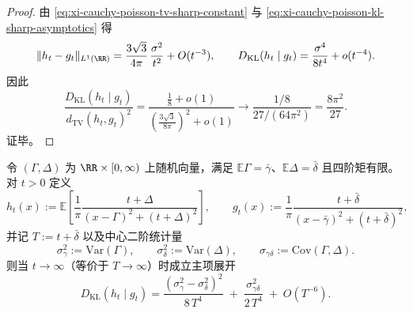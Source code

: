 \begin{proof}
由 \eqref{eq:xi-cauchy-poisson-tv-sharp-constant} 与 \eqref{eq:xi-cauchy-poisson-kl-sharp-asymptotics} 得
\[
\|h_t-g_t\|_{L^1(\RR)}
=\frac{3\sqrt3}{4\pi}\,\frac{\sigma^2}{t^2}+O(t^{-3}),
\qquad
D_{\mathrm{KL}}(h_t\mid g_t)=\frac{\sigma^4}{8t^4}+o(t^{-4}).
\]
因此
\[
\frac{D_{\mathrm{KL}}(h_t\mid g_t)}{d_{\mathrm{TV}}(h_t,g_t)^2}
=\frac{\frac{1}{8}+o(1)}{\left(\frac{3\sqrt3}{8\pi}\right)^2+o(1)}
\to \frac{1/8}{27/(64\pi^2)}=\frac{8\pi^2}{27}.
\]
证毕。
\end{proof}
\begin{theorem}[双通道粗粒化的正交主模态分解]\label{thm:xi-cauchy-poisson-two-channel-orthogonal-leading}
令 \((\Gamma,\Delta)\) 为 \(\RR\times[0,\infty)\) 上随机向量，满足
\(
\mathbb{E}\Gamma=\bar\gamma
\)、\(
\mathbb{E}\Delta=\bar\delta
\) 且四阶矩有限。
对 \(t>0\) 定义
\[
h_t(x):=\mathbb{E}\!\left[\frac{1}{\pi}\frac{t+\Delta}{(x-\Gamma)^2+(t+\Delta)^2}\right],
\qquad
g_t(x):=\frac{1}{\pi}\frac{t+\bar\delta}{(x-\bar\gamma)^2+(t+\bar\delta)^2},
\]
并记 \(T:=t+\bar\delta\) 以及中心二阶统计量
\[
\sigma_\gamma^2:=\mathrm{Var}(\Gamma),\qquad
\sigma_\delta^2:=\mathrm{Var}(\Delta),\qquad
\sigma_{\gamma\delta}:=\mathrm{Cov}(\Gamma,\Delta).
\]
则当 \(t\to\infty\)（等价于 \(T\to\infty\)）时成立主项展开
\begin{equation}\label{eq:xi-cauchy-poisson-two-channel-kl-leading}
\boxed{\;
D_{\mathrm{KL}}(h_t\mid g_t)
=\frac{(\sigma_\gamma^2-\sigma_\delta^2)^2}{8\,T^4}
\;+\;\frac{\sigma_{\gamma\delta}^2}{2\,T^4}
\;+\;O(T^{-6}).\;}
\end{equation}
\end{theorem}

